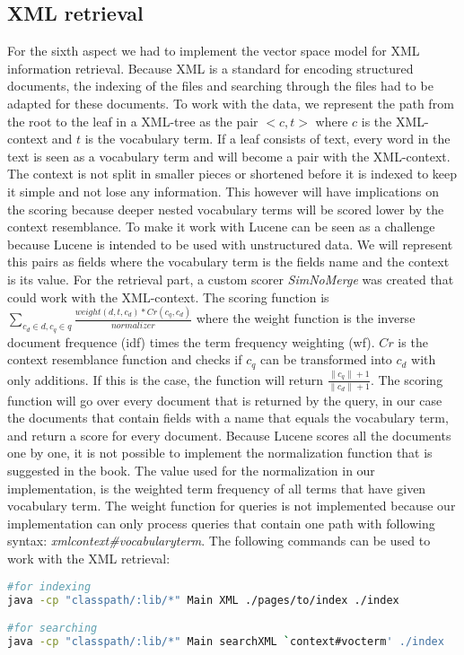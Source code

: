 \documentclass{article}
\begin{document}
\subsection{XML retrieval}
For the sixth aspect we had to implement the vector space model for XML information retrieval.
Because XML is a standard for encoding structured documents, the indexing of the files and searching
through the files had to be adapted for these documents. To work with the data, we represent the path from the root to
the leaf in a XML-tree as the pair $<c,t>$ where $c$ is the XML-context and $t$ is the vocabulary term. If a leaf consists
of text, every word in the text is seen as a vocabulary term and will become a pair with the XML-context.
The context is not split in smaller pieces or shortened before it is indexed to keep it simple and not lose any information.
This however will have implications on the scoring because deeper nested vocabulary terms will be scored lower by the context resemblance.
To make it work with Lucene can be seen as a challenge because Lucene is intended to be used with unstructured data.
We will represent this pairs as fields where the vocabulary term is the fields name and the context is its value.
For the retrieval part, a custom scorer \emph{SimNoMerge} was created that could work with the XML-context.
The scoring function is $\sum_{c_{d} \in d, c_{q} \in q}\frac{weight(d,t,c_{d}) * Cr(c_{q}, c_{d})}{normalizer}$ where the weight function is the
inverse document frequence (idf) times the term frequency weighting (wf). $Cr$ is the context resemblance function and checks
if $c_{q}$ can be transformed into $c_{d}$ with only additions. If this is the case, the function will return $\frac{\|c_{q}\| + 1}{\|c_{d}\| + 1}$.
The scoring function will go over every document that is returned by the query, in our case the documents that contain
fields with a name that equals the vocabulary term, and return a score for every document.
Because Lucene scores all the documents one by one, it is not possible to implement the normalization function that is
suggested in the book. The value used for the normalization in our implementation, is the weighted term frequency of all terms
that have given vocabulary term.
The weight function for queries is not implemented because our implementation can only process queries that contain one
path with following syntax: \emph{xml\/context\#vocabularyterm}.
The following commands can be used to work with the XML retrieval:
\begin{lstlisting}[language=Bash, label={lst:search}]
#for indexing
java -cp "classpath/:lib/*" Main XML ./pages/to/index ./index

#for searching
java -cp "classpath/:lib/*" Main searchXML `context#vocterm' ./index
\end{lstlisting}
\end{document}

